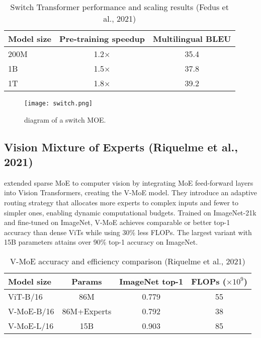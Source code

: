 \begin{table}[h!]
  \centering
  \caption{Switch Transformer performance and scaling results (Fedus et al., 2021)}
  \label{tab:switch-transformer}
  \begin{tabular}{lcc}
    \hline
    Model size & Pre-training speedup & Multilingual BLEU \\
    \hline
    200M & 1.2$\times$ & 35.4 \\
    1B & 1.5$\times$ & 37.8 \\
    1T & 1.8$\times$ & 39.2 \\
    \hline
  \end{tabular}
\end{table}

\begin{figure}[H]
  \centering
  \texttt{[image: switch.png]}
  \caption{diagram of a switch MOE.}
  \label{fig:switch-transformer}
\end{figure}

\subsection{Vision Mixture of Experts (Riquelme et al., 2021)}
\textcite{riquelme2021scaling} extended sparse MoE to computer vision by integrating MoE feed-forward layers into Vision Transformers, creating the V-MoE model. They introduce an adaptive routing strategy that allocates more experts to complex inputs and fewer to simpler ones, enabling dynamic computational budgets. Trained on ImageNet-21k and fine-tuned on ImageNet, V-MoE achieves comparable or better top-1 accuracy than dense ViTs while using 30\% less FLOPs. The largest variant with 15B parameters attains over 90\% top-1 accuracy on ImageNet.

\begin{table}[h!]
  \centering
  \caption{V-MoE accuracy and efficiency comparison (Riquelme et al., 2021)}
  \label{tab:vmoe-results}
  \begin{tabular}{lccc}
    \hline
    Model size & Params & ImageNet top-1 & FLOPs ($\times10^9$) \\
    \hline
    ViT-B/16 & 86M & 0.779 & 55 \\
    V-MoE-B/16 & 86M+Experts & 0.792 & 38 \\
    V-MoE-L/16 & 15B & 0.903 & 85 \\
    \hline
  \end{tabular}
\end{table}

